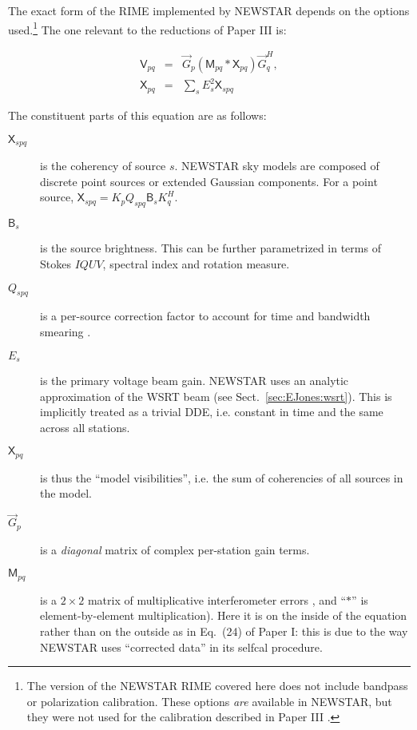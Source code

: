 \documentclass{aa}
\newcommand{\herm}{H}
\newcommand{\jones}[2]{\vec {#1}_{#2}}
\newcommand{\jonesT}[2]{\vec {#1}^{\herm}_{#2}}
\newcommand{\coh}[2]{\mathsf{{#1}}_{{#2}}}
\begin{document}
The exact form of the RIME implemented by NEWSTAR depends on the options used.\footnote{The version of the NEWSTAR RIME covered here does not include bandpass or polarization calibration. These options \emph{are} available in NEWSTAR, but they were not used for the calibration described in Paper III \citep{RRIME3}.} The one relevant to the reductions of Paper III is:

\begin{eqnarray}\label{eq:newstar-rime}
\coh{V}{pq} & = & \jones{G}{p} \left ( \coh{M}{pq} \ast \coh{X}{pq} \right ) \jonesT{G}{q}, \\
\nonumber \coh{X}{pq} & = & \sum_{s} E^2_s \coh{X}{spq} 
\end{eqnarray}

The constituent parts of this equation are as follows:
\begin{description}
\item[$\coh{X}{spq}$] is the coherency of source $s$. NEWSTAR sky models are composed of discrete point sources or extended Gaussian components. For a point source, $\coh{X}{spq} = K_p Q_{spq} \coh{B}{s} K^\herm_q$.

\item[$\coh{B}{s}$] is the source brightness. This can be further parametrized in terms of Stokes $IQUV$, spectral index and rotation measure.

\item[$Q_{spq}$] is a per-source correction factor to account for time and bandwidth smearing \citep[see Paper I,][Sect.~5.2]{RRIME1}.

\item[$E_s$] is the primary voltage beam gain. NEWSTAR uses an analytic approximation of the WSRT beam (see Sect.~\ref{sec:EJones:wsrt}). This is implicitly treated as a trivial DDE, i.e. constant in time and the same across all stations.

\item[$\coh{X}{pq}$] is thus the ``model visibilities'', i.e. the sum of coherencies of all sources in the model.

\item[$\jones{G}{p}$] is a {\em diagonal} matrix of complex per-station gain terms.

\item[$\coh{M}{pq}$] is a $2\times2$ matrix of multiplicative interferometer errors \citep[see Paper I,][Sect.~5.3]{RRIME1}, and ``$\ast$'' is element-by-element multiplication). Here it is on the inside of the equation rather than on the outside as in Eq.~(24) of Paper I: this is due to the way NEWSTAR uses ``corrected data'' in its selfcal procedure.%

\end{description}
\end{document}
